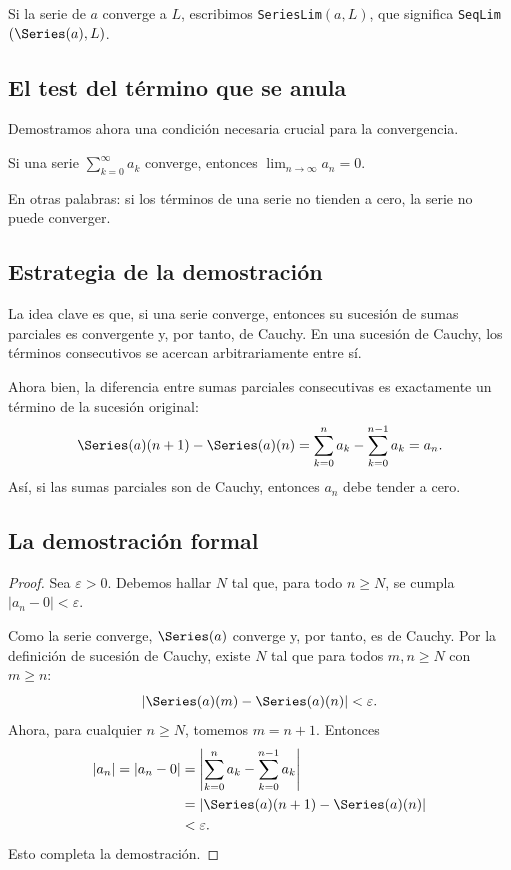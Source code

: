 \begin{definicion}[SeriesLim]
Si la serie de $a$ converge a $L$, escribimos \texttt{SeriesLim}$(a, L)$, que significa \texttt{SeqLim}$(\Series(a), L)$.
\end{definicion}

\subsection{El test del término que se anula}

Demostramos ahora una condición necesaria crucial para la convergencia.

\begin{teorema}
Si una serie $\sum_{k=0}^{\infty} a_k$ converge, entonces $\lim_{n\to\infty} a_n = 0$.
\end{teorema}

En otras palabras: si los términos de una serie no tienden a cero, la serie no puede converger.

\subsection{Estrategia de la demostración}

La idea clave es que, si una serie converge, entonces su sucesión de sumas parciales es convergente y, por tanto, de Cauchy. En una sucesión de Cauchy, los términos consecutivos se acercan arbitrariamente entre sí.

Ahora bien, la diferencia entre sumas parciales consecutivas es exactamente un término de la sucesión original:
\[
  \Series(a)(n+1) - \Series(a)(n) = \sum_{k=0}^{n} a_k - \sum_{k=0}^{n-1} a_k = a_n .
\]
Así, si las sumas parciales son de Cauchy, entonces $a_n$ debe tender a cero.

\subsection{La demostración formal}

\begin{proof}
Sea $\varepsilon > 0$. Debemos hallar $N$ tal que, para todo $n \ge N$, se cumpla $|a_n - 0| < \varepsilon$.

Como la serie converge, $\Series(a)$ converge y, por tanto, es de Cauchy. Por la definición de sucesión de Cauchy, existe $N$ tal que para todos $m, n \ge N$ con $m \ge n$:
\[
  |\Series(a)(m) - \Series(a)(n)| < \varepsilon .
\]
Ahora, para cualquier $n \ge N$, tomemos $m = n+1$. Entonces
\begin{align*}
  |a_n| = |a_n - 0|
  &= \left| \sum_{k=0}^{n} a_k - \sum_{k=0}^{n-1} a_k \right|\\
  &= |\Series(a)(n+1) - \Series(a)(n)|\\
  &< \varepsilon .
\end{align*}
Esto completa la demostración.
\end{proof}

